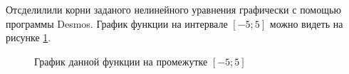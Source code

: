 Отсделилили корни заданого нелинейного уравнения графически с помощью программы Desmos. График функции на интервале $[-5;5]$ можно видеть на рисунке \ref{fig:graph}.
\begin{figure}
    \centering
    \caption{График данной функции на промежутке $[-5; 5]$}
    \label{fig:graph}
\end{figure}

